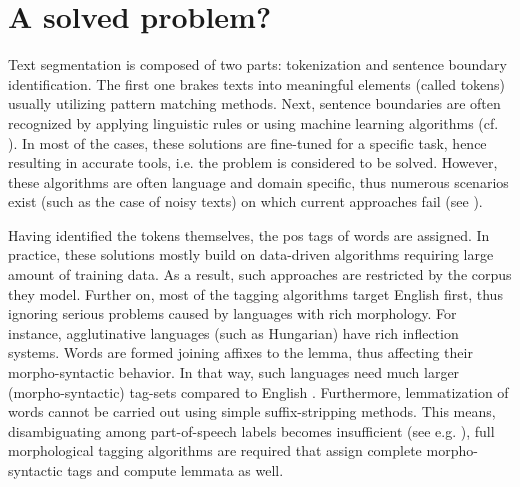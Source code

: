 \section{A solved problem?}



Text segmentation is composed of two parts: tokenization and sentence boundary identification. 
The first one brakes texts into meaningful elements (called tokens) usually utilizing pattern matching methods.
Next, sentence boundaries are often recognized by applying linguistic rules or using machine learning algorithms (cf. \cite{read2012sentence}).
In most of the cases, these solutions are fine-tuned for a specific task, hence resulting in accurate tools, i.e. the problem is considered to be solved.
However, these algorithms are often language and domain specific, thus numerous scenarios exist (such as the case of noisy texts) on which current approaches fail (see \cite{Savova2010}).

Having identified the tokens themselves, the \gls{pos} tags of words are assigned.
In practice, these solutions mostly build on data-driven algorithms requiring large amount of training data.
As a result, such approaches are restricted by the corpus they model.
Further on, most of the tagging algorithms target English first, thus ignoring serious problems caused by languages with rich morphology.
For instance, agglutinative languages (such as Hungarian) have rich inflection systems.
Words are formed joining affixes to the lemma, thus affecting their morpho-syntactic behavior.
In that way, such languages need much larger (morpho-syntactic) tag-sets compared to English \cite{Erjavec2012}. 
Furthermore, lemmatization of words cannot be carried out using simple suffix-stripping methods.
This means, disambiguating among part-of-speech labels becomes insufficient (see e.g. \cite{Jongejan}), full morphological tagging algorithms are required that assign complete morpho-syntactic tags and compute lemmata as well.

